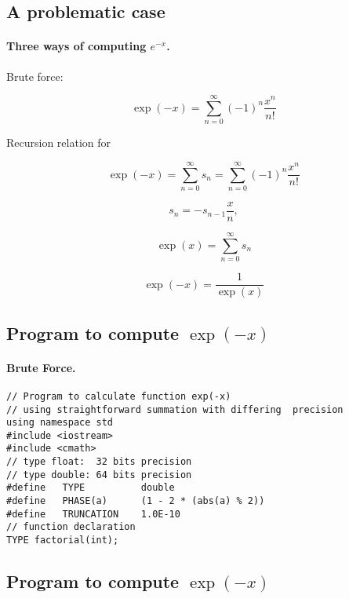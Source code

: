 \documentclass[%
oneside,                 %
final,                   %
10pt]{article}
\begin{document}
\noindent



\subsection*{A problematic case}


\paragraph{Three ways of computing $e^{-x}$.}
Brute force:

\[\exp{(-x)}=\sum_{n=0}^{\infty}(-1)^n\frac{x^n}{n!}\]

Recursion relation for

\[ \exp{(-x)}=\sum_{n=0}^{\infty}s_n=\sum_{n=0}^{\infty}(-1)^n\frac{x^n}{n!} \]

\[ s_n=-s_{n-1}\frac{x}{n}, \]

\[ \exp{(x)}=\sum_{n=0}^{\infty}s_n \]

\[ \exp{(-x)}=\frac{1}{\exp{(x)}} \]



\subsection*{Program to compute $\exp{(-x)}$}


\paragraph{Brute Force.}
\begin{verbatim}
// Program to calculate function exp(-x)
// using straightforward summation with differing  precision
using namespace std
#include <iostream>
#include <cmath>
// type float:  32 bits precision
// type double: 64 bits precision
#define   TYPE          double
#define   PHASE(a)      (1 - 2 * (abs(a) % 2))
#define   TRUNCATION    1.0E-10
// function declaration
TYPE factorial(int);
\end{verbatim}



\subsection*{Program to compute $\exp{(-x)}$}
\end{document}
